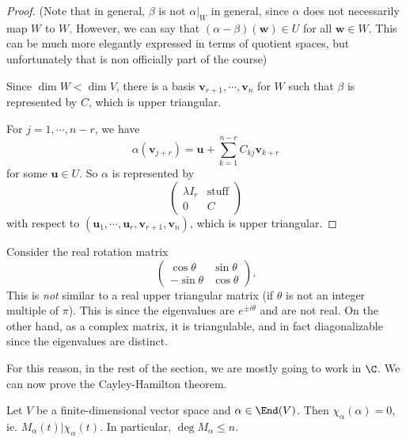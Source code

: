 \documentclass[a4paper]{article}
\begin{document}
\begin{proof}
  (Note that in general, $\beta$ is not $\alpha|_W$ in general, since $\alpha$ does not necessarily map $W$ to $W$. However, we can say that $(\alpha - \beta) (\mathbf{w}) \in U$ for all $\mathbf{w}\in W$. This can be much more elegantly expressed in terms of quotient spaces, but unfortunately that is non officially part of the course)

  Since $\dim W < \dim V$, there is a basis $\mathbf{v}_{r + 1}, \cdots, \mathbf{v}_n$ for $W$ such that $\beta$ is represented by $C$, which is upper triangular.

  For $j = 1, \cdots, n - r$, we have
  \[
    \alpha(\mathbf{v}_{j + r}) = \mathbf{u} + \sum_{k = 1}^{n - r} C_{kj} \mathbf{v}_{k + r}
  \]
  for some $\mathbf{u} \in U$. So $\alpha$ is represented by
  \[
    \begin{pmatrix}
      \lambda I_r & \text{stuff}\\
      0 & C
    \end{pmatrix}
  \]
  with respect to $(\mathbf{u}_1, \cdots, \mathbf{u}_r, \mathbf{v}_{r + 1}, \mathbf{v}_n)$, which is upper triangular.
\end{proof}

\begin{eg}
  Consider the real rotation matrix
  \[
    \begin{pmatrix}
      \cos \theta & \sin \theta\\
      -\sin \theta & \cos \theta
    \end{pmatrix}.
  \]
  This is \emph{not} similar to a real upper triangular matrix (if $\theta$ is not an integer multiple of $\pi$). This is since the eigenvalues are $e^{\pm i\theta}$ and are not real. On the other hand, as a complex matrix, it is triangulable, and in fact diagonalizable since the eigenvalues are distinct.
\end{eg}
For this reason, in the rest of the section, we are mostly going to work in $\C$. We can now prove the Cayley-Hamilton theorem.

\begin{thm}
  Let $V$ be a finite-dimensional vector space and $\alpha \in \End(V)$. Then $\chi_\alpha(\alpha) = 0$, ie. $M_\alpha(t) | \chi_\alpha(t)$. In particular, $\deg M_\alpha \leq n$.
\end{thm}
\end{document}
